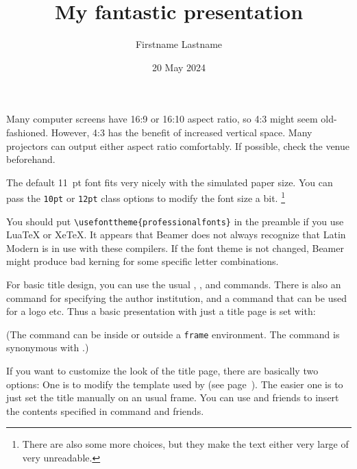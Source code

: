 \begin{practices}
Many computer screens have 16:9 or 16:10 aspect ratio, so 4:3 might seem old-fashioned.
However, 4:3 has the benefit of increased vertical space.
Many projectors can output either aspect ratio comfortably.
If possible, check the venue beforehand.
\end{practices}

The default 11~pt font fits very nicely with the simulated paper size.
You can pass the \verb|10pt| or \verb|12pt| class options to modify the font size a bit.%
\footnote{There are also some more choices,
but they make the text either very large of very unreadable.}

\begin{gotcha}
You should put \verb|\usefonttheme{professionalfonts}| in the preamble
if you use \mbox{LuaTeX} or XeTeX.
It appears that Beamer does not always recognize that Latin Modern is in use with these compilers.
If the font theme is not changed,
Beamer might produce bad kerning for some specific letter combinations.
\end{gotcha}


For basic title design, you can use the usual , , and  commands.
There is also an  command for specifying the author institution,
and a  command that can be used for a logo etc.
Thus a basic presentation with just a title page is set with:
%
\begin{ExampleCode}
\title{My fantastic presentation}
\author{Firstname Lastname}
\date{20 May 2024}



\maketitle


\end{ExampleCode}
%
%
(The  command can be inside or outside a \verb|frame| environment.
The command is synonymous with .)

\begin{technote}
If you want to customize the look of the title page, there are basically two options:
One is to modify the template used by  (see page~\pageref{sec:beamer templates}).
The easier one is to just set the title manually on an usual frame.
You can use  and friends to insert the contents
specified in  command and friends.
\end{technote}

